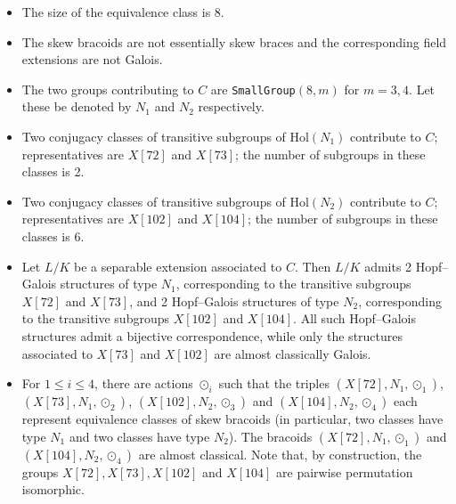 \documentclass[a4paper,11pt]{article}
\begin{document}
	\begin{itemize}
		\item 
		The size of the equivalence class is 8.
		
		\item 
		The skew bracoids are not essentially skew braces and 
		the corresponding field extensions are not Galois. 
		
		\item 
		The two groups contributing to $C$ are {\tt SmallGroup}$(8, m)$ for $m= 3, 4$. Let these be denoted by $N_1$ and $N_2$ respectively.
		
		\item 
		Two conjugacy classes of transitive subgroups of $\mathrm{Hol}(N_1)$ 
		contribute to $C$; representatives are $X[72]$ and $X[73]$; the 
		number of subgroups in these classes is 2. 
		
		\item 
		Two conjugacy classes of transitive subgroups of $\mathrm{Hol}(N_2)$
		contribute to $C$; representatives  are $X[102]$ and $X[104]$; 
		the number of subgroups in these classes is 6. 
		
		\item Let $L/K$ be a separable extension associated to $C$. Then $L/K$ admits 2 Hopf--Galois structures of type $N_1$, corresponding to the transitive subgroups $X[72]$ and $X[73]$, and 2 Hopf--Galois structures of type $N_2$, corresponding to the transitive subgroups $X[102]$ and $X[104]$. All such Hopf--Galois structures admit a bijective correspondence, while only the structures associated to  $X[73]$ and $X[102]$  are almost classically Galois.
		
		\item For $1 \leq i \leq 4$, there are actions $\odot_i$ such that the triples $(X[72],N_1,\odot_1)$, $(X[73],N_1,\odot_2)$, $(X[102],N_2,\odot_3)$ and $(X[104],N_2,\odot_4)$ each represent equivalence classes of skew bracoids (in particular, two classes have type $N_1$ and two classes have type $N_2$). The bracoids $(X[72],N_1,\odot_1)$ and  $(X[104],N_2,\odot_4)$  are almost classical. Note that, by construction, the groups $X[72],X[73],X[102]$ and $X[104]$ are pairwise permutation isomorphic.
		
	\end{itemize}
	
\end{document}
